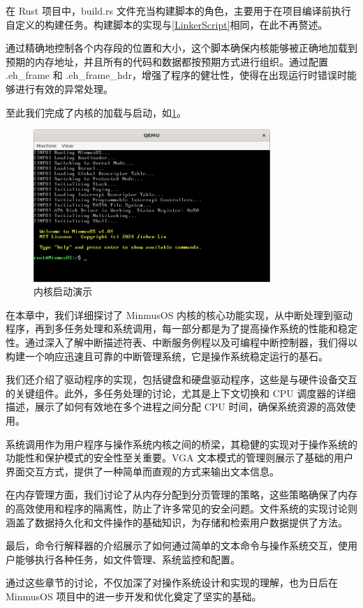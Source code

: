 在 Rust 项目中，build.rs 文件充当构建脚本的角色，主要用于在项目编译前执行自定义的构建任务。构建脚本的实现与\cref{LinkerScript}相同，在此不再赘述。

通过精确地控制各个内存段的位置和大小，这个脚本确保内核能够被正确地加载到预期的内存地址，并且所有的代码和数据都按预期方式进行组织。通过配置 .eh\_frame 和 .eh\_frame\_hdr，增强了程序的健壮性，使得在出现运行时错误时能够进行有效的异常处理。

至此我们完成了内核的加载与启动，如\cref{fig:KernelBootPresentation}。

\begin{figure}[htbp]
    \centering
    \includegraphics[width=0.8\textwidth]{figures/KernelBootPresentation.png}
    \caption{内核启动演示}
    \label{fig:KernelBootPresentation}
\end{figure}

在本章中，我们详细探讨了 MinmusOS 内核的核心功能实现，从中断处理到驱动程序，再到多任务处理和系统调用，每一部分都是为了提高操作系统的性能和稳定性。通过深入了解中断描述符表、中断服务例程以及可编程中断控制器，我们得以构建一个响应迅速且可靠的中断管理系统，它是操作系统稳定运行的基石。

我们还介绍了驱动程序的实现，包括键盘和硬盘驱动程序，这些是与硬件设备交互的关键组件。此外，多任务处理的讨论，尤其是上下文切换和 CPU 调度器的详细描述，展示了如何有效地在多个进程之间分配 CPU 时间，确保系统资源的高效使用。

系统调用作为用户程序与操作系统内核之间的桥梁，其稳健的实现对于操作系统的功能性和保护模式的安全性至关重要。VGA 文本模式的管理则展示了基础的用户界面交互方式，提供了一种简单而直观的方式来输出文本信息。

在内存管理方面，我们讨论了从内存分配到分页管理的策略，这些策略确保了内存的高效使用和程序的隔离性，防止了许多常见的安全问题。文件系统的实现讨论则涵盖了数据持久化和文件操作的基础知识，为存储和检索用户数据提供了方法。

最后，命令行解释器的介绍展示了如何通过简单的文本命令与操作系统交互，使用户能够执行各种任务，如文件管理、系统监控和配置。

通过这些章节的讨论，不仅加深了对操作系统设计和实现的理解，也为日后在 MinmusOS 项目中的进一步开发和优化奠定了坚实的基础。